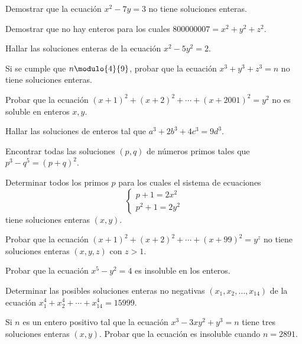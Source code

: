 \begin{exercise}
    Demostrar que la ecuación $x^2 - 7y = 3$ no tiene soluciones enteras.
\end{exercise}

\begin{exercise}
    Demostrar que no hay enteros para los cuales $800000007 = x^2 + y^2 + z^2$.
\end{exercise}

\begin{exercise}
    Hallar las soluciones enteras de la ecuación $x^2 - 5y^2 = 2$.
\end{exercise}

\begin{exercise}
    Si se cumple que $n \modulo{4}{9}$, probar que la ecuación $x^3 + y^3 + z^3 = n$ no tiene soluciones enteras.
\end{exercise}

\begin{exercise}
    Probar que la ecuación $(x + 1)^2 + (x + 2)^2 + \cdots + (x + 2001)^2 = y^2$ no es soluble en enteros $x,y$.
\end{exercise}

\begin{exercise}
    Hallar las soluciones de enteros tal que $a^3 + 2b^3 + 4c^3 = 9d^3$.
\end{exercise}

\begin{exercise}
    Encontrar todas las soluciones $(p,q)$ de números primos tales que $p^3 - q^5 = (p + q)^2$.
\end{exercise}

\begin{exercise}
    Determinar todos los primos $p$ para los cuales el sistema de ecuaciones
    \[
        \begin{cases}
            p + 1 = 2x^2\\
            p^2 + 1 = 2y^2
        \end{cases}
    \]
    tiene soluciones enteras $(x,y)$.
\end{exercise}

\begin{exercise}
    Probar que la ecuación $(x + 1)^2 + (x + 2)^2 + \cdots + (x + 99)^2 = y^z$ no tiene soluciones enteras $(x,y,z)$ con $z > 1$.
\end{exercise}

\begin{exercise}
    Probar que la ecuación $x^5 - y^2 = 4$ es insoluble en los enteros.
\end{exercise}

\begin{exercise}
    Determinar las posibles soluciones enteras no negativas $(x_1, x_2, \ldots, x_{14})$ de la ecuación $x_1^4 + x_2^4 + \cdots + x_{14}^4 = 15999$.
\end{exercise}

\begin{exercise}
    Si $n$ es un entero positivo tal que la ecuación $x^3 - 3xy^2 + y^3 = n$ tiene tres soluciones enteras $(x,y)$.
    Probar que la ecuación es insoluble cuando $n = 2891$.
\end{exercise}
